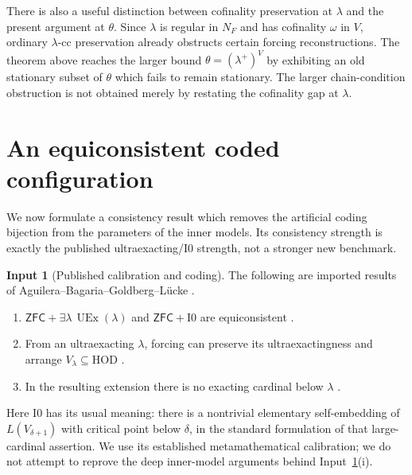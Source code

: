 \documentclass[11pt,letterpaper]{article}
\theoremstyle{definition}
\newtheorem{inputthm}{Input}
\numberwithin{equation}{section}
\newcommand{\ZFC}{\mathsf{ZFC}}
\newcommand{\HOD}{\mathrm{HOD}}
\newcommand{\UEx}{\operatorname{UEx}}
\newcommand{\Izero}{\mathrm{I0}}
\begin{document}
There is also a useful distinction between cofinality preservation at $\lambda$ and the present argument at $\theta$. Since $\lambda$ is regular in $N_F$ and has cofinality $\omega$ in $V$, ordinary $\lambda$-cc preservation already obstructs certain forcing reconstructions. The theorem above reaches the larger bound $\theta=(\lambda^+)^V$ by exhibiting an old stationary subset of $\theta$ which fails to remain stationary. The larger chain-condition obstruction is not obtained merely by restating the cofinality gap at $\lambda$.

\section{An equiconsistent coded configuration}\label{sec:consistency}

We now formulate a consistency result which removes the artificial coding bijection from the parameters of the inner models. Its consistency strength is exactly the published ultraexacting/$\Izero$ strength, not a stronger new benchmark.

\begin{inputthm}[Published calibration and coding]\label{input:consistency}
The following are imported results of Aguilera--Bagaria--Goldberg--L\"ucke \cite{abgl}.
\begin{enumerate}[label=\textup{(\roman*)}]
\item $\ZFC+\exists\lambda\,\UEx(\lambda)$ and $\ZFC+\Izero$ are equiconsistent \cite[Theorem~4.5]{abgl}.
\item From an ultraexacting $\lambda$, forcing can preserve its ultraexactingness and arrange $V_\lambda\subseteq\HOD$ \cite[Proposition~3.9]{abgl}.
\item In the resulting extension there is no exacting cardinal below $\lambda$ \cite[Corollary~3.10]{abgl}.
\end{enumerate}
\end{inputthm}

Here $\Izero$ has its usual meaning: there is a nontrivial elementary self-embedding of $L(V_{\delta+1})$ with critical point below $\delta$, in the standard formulation of that large-cardinal assertion. We use its established metamathematical calibration; we do not attempt to reprove the deep inner-model arguments behind Input~\ref{input:consistency}(i).
\end{document}
